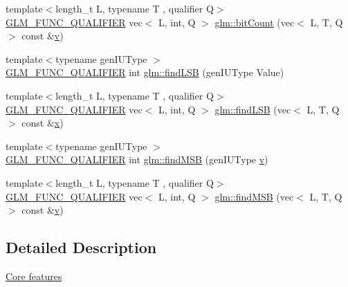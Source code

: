 \begin{DoxyCompactItemize}
\item 
{\footnotesize template$<$length\+\_\+t L, typename T , qualifier Q$>$ }\\\hyperlink{setup_8hpp_a33fdea6f91c5f834105f7415e2a64407}{G\+L\+M\+\_\+\+F\+U\+N\+C\+\_\+\+Q\+U\+A\+L\+I\+F\+I\+ER} vec$<$ L, int, Q $>$ \hyperlink{group__core__func__integer_gaac7b15e40bdea8d9aa4c4cb34049f7b5}{glm\+::bit\+Count} (vec$<$ L, T, Q $>$ const \&\hyperlink{_s_d_l__opengl_8h_a10a82eabcb59d2fcd74acee063775f90}{v})
\item 
{\footnotesize template$<$typename gen\+I\+U\+Type $>$ }\\\hyperlink{setup_8hpp_a33fdea6f91c5f834105f7415e2a64407}{G\+L\+M\+\_\+\+F\+U\+N\+C\+\_\+\+Q\+U\+A\+L\+I\+F\+I\+ER} int \hyperlink{group__core__func__integer_gaf74c4d969fa34ab8acb9d390f5ca5274}{glm\+::find\+L\+SB} (gen\+I\+U\+Type Value)
\item 
{\footnotesize template$<$length\+\_\+t L, typename T , qualifier Q$>$ }\\\hyperlink{setup_8hpp_a33fdea6f91c5f834105f7415e2a64407}{G\+L\+M\+\_\+\+F\+U\+N\+C\+\_\+\+Q\+U\+A\+L\+I\+F\+I\+ER} vec$<$ L, int, Q $>$ \hyperlink{group__core__func__integer_ga4454c0331d6369888c28ab677f4810c7}{glm\+::find\+L\+SB} (vec$<$ L, T, Q $>$ const \&\hyperlink{_s_d_l__opengl_8h_ad0e63d0edcdbd3d79554076bf309fd47}{x})
\item 
{\footnotesize template$<$typename gen\+I\+U\+Type $>$ }\\\hyperlink{setup_8hpp_a33fdea6f91c5f834105f7415e2a64407}{G\+L\+M\+\_\+\+F\+U\+N\+C\+\_\+\+Q\+U\+A\+L\+I\+F\+I\+ER} int \hyperlink{group__core__func__integer_ga7e4a794d766861c70bc961630f8ef621}{glm\+::find\+M\+SB} (gen\+I\+U\+Type \hyperlink{_s_d_l__opengl_8h_a10a82eabcb59d2fcd74acee063775f90}{v})
\item 
{\footnotesize template$<$length\+\_\+t L, typename T , qualifier Q$>$ }\\\hyperlink{setup_8hpp_a33fdea6f91c5f834105f7415e2a64407}{G\+L\+M\+\_\+\+F\+U\+N\+C\+\_\+\+Q\+U\+A\+L\+I\+F\+I\+ER} vec$<$ L, int, Q $>$ \hyperlink{group__core__func__integer_ga39ac4d52028bb6ab08db5ad6562c2872}{glm\+::find\+M\+SB} (vec$<$ L, T, Q $>$ const \&\hyperlink{_s_d_l__opengl_8h_a10a82eabcb59d2fcd74acee063775f90}{v})
\end{DoxyCompactItemize}


\subsection{Detailed Description}
\hyperlink{group__core}{Core features} 